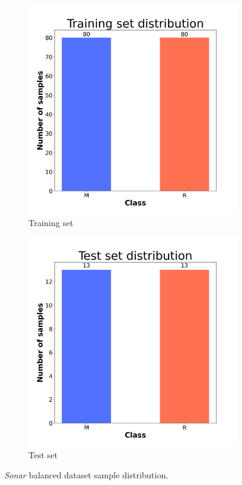 \begin{figure}[H]
    \centering
    \begin{subfigure}[t]{0.45\textwidth}
        \centering
        \includegraphics[width=1\textwidth]{images/exper1/Sonar/train_dist.png}
        \caption{Training set}
    \end{subfigure}
    \begin{subfigure}[t]{0.45\textwidth}
        \centering
        \includegraphics[width=1\textwidth]{images/exper1/Sonar/test_dist.png}
        \caption{Test set}
    \end{subfigure}
    \caption{\textit{Sonar} balanced dataset sample distribution.}
\end{figure}

